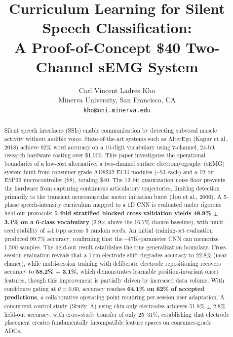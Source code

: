 \documentclass{article}
\date{}
\title{Curriculum Learning for Silent Speech Classification:\\ A Proof-of-Concept \$40 Two-Channel sEMG System}
\author{
  Carl Vincent Ladres Kho \\
  Minerva University, San Francisco, CA \\
  \texttt{kho@uni.minerva.edu} \\
}
\begin{document}
\maketitle

\begin{abstract}
Silent speech interfaces (SSIs) enable communication by detecting subvocal muscle activity without audible voice. State-of-the-art systems such as AlterEgo (Kapur et al., 2018) achieve 92\% word accuracy on a 10-digit vocabulary using 7-channel, 24-bit research hardware costing over \$1{,}000. This paper investigates the operational boundaries of a low-cost alternative: a two-channel surface electromyography (sEMG) system built from consumer-grade AD8232 ECG modules (\textasciitilde\$3 each) and a 12-bit ESP32 microcontroller (\$8), totaling \$40. The 12-bit quantization noise floor prevents the hardware from capturing continuous articulatory trajectories, limiting detection primarily to the transient neuromuscular motor initiation burst (Jou et al., 2006). A 5-phase speech-intensity curriculum mapped to a 1D CNN is evaluated under rigorous held-out protocols: \textbf{5-fold stratified blocked cross-validation yields 48.9\% $\pm$ 3.1\% on a 6-class vocabulary} (2.9$\times$ above the 16.7\% chance baseline), with multi-seed stability of $\pm$1.0\,pp across 5 random seeds. An initial training-set evaluation produced 99.7\% accuracy, confirming that the \textasciitilde47K-parameter CNN can memorize 1,500 samples. The held-out result establishes the true generalization boundary. Cross-session evaluation reveals that a 1\,cm electrode shift degrades accuracy to 22.8\% (near chance), while multi-session training with deliberate electrode repositioning recovers accuracy to \textbf{58.2\% $\pm$ 3.1\%}, which demonstrates learnable position-invariant onset features, though this improvement is partially driven by increased data volume. With confidence gating at $\theta = 0.60$, accuracy reaches \textbf{64.1\% on 62\% of accepted predictions}, a collaborative operating point requiring per-session user adaptation. A concurrent control study (Study~A) using chin-only electrodes achieves 51.8\% $\pm$ 2.8\% held-out accuracy, with cross-study transfer of only 25--31\%, establishing that electrode placement creates fundamentally incompatible feature spaces on consumer-grade ADCs.
\end{abstract}
\end{document}
